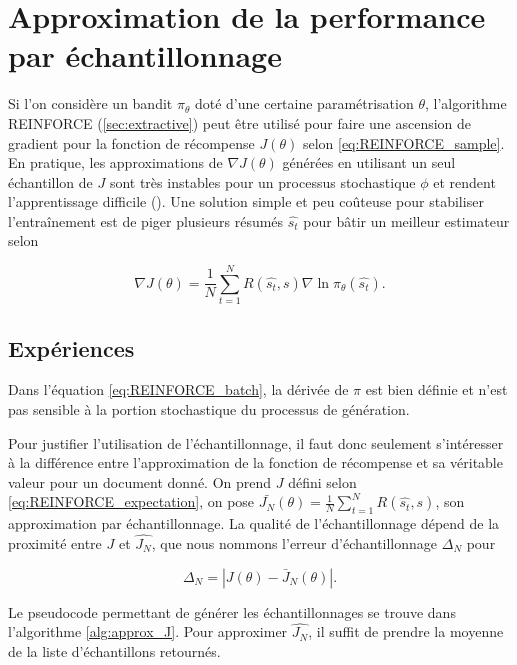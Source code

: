 \section{Approximation de la performance par échantillonnage}

Si l'on considère un bandit $\pi_\theta$ doté d'une certaine paramétrisation $\theta$,
l'algorithme REINFORCE (\ref{sec:extractive}) peut être utilisé pour faire une ascension
de gradient pour la fonction de récompense $J(\theta)$ selon \eqref{eq:REINFORCE_sample}.
En pratique, les approximations de $\nabla J(\theta)$ générées en utilisant un seul
échantillon de $J$ sont très instables pour un processus stochastique $\phi$
et rendent l'apprentissage difficile ().
Une solution simple et peu coûteuse pour stabiliser l'entraînement est de piger plusieurs
résumés $\hat{s_t}$ pour bâtir un meilleur estimateur selon

\begin{equation}
    \nabla J(\theta) = \frac{1}{N} \sum_{t=1}^N R(\hat{s_t}, s) \nabla \ln \pi_\theta(\hat{s_t}).
    \label{eq:REINFORCE_batch}
\end{equation}

\subsection{Expériences}

Dans l'équation \eqref{eq:REINFORCE_batch}, la dérivée de $\pi$ est bien définie et n'est pas
sensible à la portion stochastique du processus de génération.

Pour justifier l'utilisation de l'échantillonnage, il faut donc seulement s'intéresser
à la différence entre l'approximation de la fonction de récompense et sa véritable valeur
pour un document donné.
On prend $J$ défini selon \eqref{eq:REINFORCE_expectation}, on pose $\bar{J_N}(\theta) =  \frac{1}{N} \sum_{t=1}^N R(\hat{s_t}, s)$,
son approximation par échantillonnage.
La qualité de l'échantillonnage dépend de la proximité entre $J$ et $\hat{J_N}$, que
nous nommons l'erreur d'échantillonnage $\Delta_N$ pour

\begin{equation}
    \Delta_N = \left| J(\theta) - \bar{J}_N(\theta) \right|.
\end{equation}

Le pseudocode permettant de générer les échantillonnages se trouve
dans l'algorithme \ref{alg:approx_J}.
Pour approximer $\hat{J_N}$, il suffit de prendre la moyenne de
la liste d'échantillons retournés.

